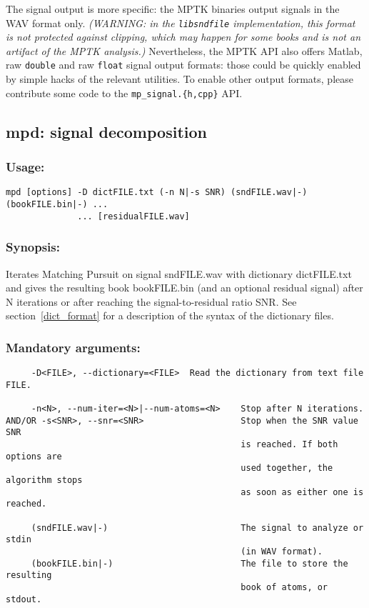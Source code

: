 \documentclass[11pt,a4paper]{article}
\begin{document}
The signal output is more specific: the MPTK binaries output signals in the WAV
format only. {\em (WARNING: in the \verb+libsndfile+ implementation, this
  format is not protected against clipping, which may happen for some books and
  is not an artifact of the MPTK analysis.)} Nevertheless, the MPTK API also
offers Matlab, raw \verb+double+ and raw \verb+float+ signal output formats:
those could be quickly enabled by simple hacks of the relevant utilities. To
enable other output formats, please contribute some code to the
\verb+mp_signal.{h,cpp}+ API.


\clearpage
\subsection{mpd: signal decomposition}

\subsubsection*{Usage:}
\begin{verbatim}
mpd [options] -D dictFILE.txt (-n N|-s SNR) (sndFILE.wav|-) (bookFILE.bin|-) ...
              ... [residualFILE.wav]
\end{verbatim}

\subsubsection*{Synopsis:}
Iterates Matching Pursuit on signal sndFILE.wav with dictionary dictFILE.txt
and gives the resulting book bookFILE.bin (and an optional residual signal)
after N iterations or after reaching the signal-to-residual ratio SNR.  See
section~\ref{dict_format} for a description of the syntax of the dictionary
files.


\subsubsection*{Mandatory arguments:}
\begin{verbatim}
     -D<FILE>, --dictionary=<FILE>  Read the dictionary from text file FILE.

     -n<N>, --num-iter=<N>|--num-atoms=<N>    Stop after N iterations.
AND/OR -s<SNR>, --snr=<SNR>                   Stop when the SNR value SNR
                                              is reached. If both options are
                                              used together, the algorithm stops
                                              as soon as either one is reached.

     (sndFILE.wav|-)                          The signal to analyze or stdin
                                              (in WAV format).
     (bookFILE.bin|-)                         The file to store the resulting
                                              book of atoms, or stdout.
\end{verbatim}
\end{document}
